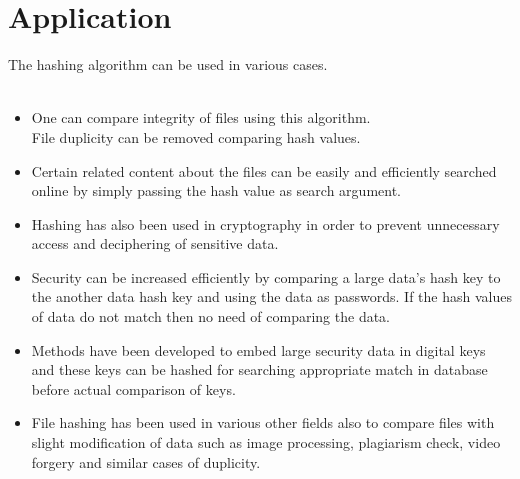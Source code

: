 \chapter{Application}
The hashing algorithm can be used in various cases.
\\~\\

\begin{itemize}
\item One can compare integrity of files using this algorithm.\\ 
          File duplicity can be removed comparing hash values.
\item  Certain related content about the files can be easily and efficiently searched online by simply passing the hash value as search argument.
\item  Hashing has also been used in cryptography in order to prevent unnecessary access and deciphering of sensitive data.
\item  Security can be increased efficiently by comparing a large data’s hash key to the another data hash key and using the data as passwords. If the hash values of data do not match then no need of comparing the data.
\item  Methods have been developed to embed large security data in digital keys and these keys can be hashed for searching appropriate match in database before actual comparison of keys.
\item	File hashing has been used in various other fields also to compare files with slight modification of data such as image processing, plagiarism check, video forgery and similar cases of duplicity.
\end{itemize}